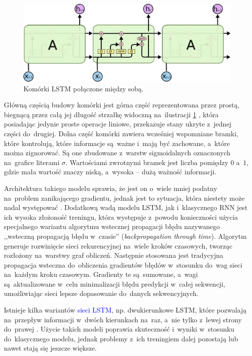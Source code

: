 \documentclass[data-science]{agh-wi} %
\begin{document}
\begin{figure}[ht!]
    \begin{center}
        \includegraphics[width=0.6\linewidth]{./img/LSTM3-chain.png}
    \end{center}
    \caption{Komórki LSTM połączone między sobą.}\label{fig:lstm_chain}
\end{figure}

Główną częścią budowy komórki jest górna część reprezentowana przez prostą, biegnącą przez całą jej długość strzałkę widoczną na~ilustracji \ref*{fig:lstm_chain} \cite{Understanding_lstm}, która posiadając jedynie proste operacje liniowe, przekazuje stany ukryte z~jednej części do~drugiej. Dolna część komórki zawiera wcześniej wspomniane bramki, które kontrolują, które informacje są~ważne i~mają być zachowane, a~które można zignorować. Są one zbudowane z~warstw sigmoidalnych oznaczonych na~grafice literami $\sigma$. Wartościami zwrotnymi bramek jest liczba pomiędzy $0$ a~$1$, gdzie mała wartość znaczy niską, a~wysoka -- dużą ważność informacji.

Architektura takiego modelu sprawia, że jest on o~wiele mniej podatny na~problem zanikającego gradientu, jednak jest to sytuacja, która niestety może nadal występować \cite{vanishing_gradient}. Dodatkową wadą modelu LSTM, jak i~klasycznego RNN jest ich wysoka złożoność treningu, która występuje z~powodu konieczności użycia specjalnego wariantu algorytmu wstecznej propagacji błędu nazywanego ,,wsteczną propagacją błędu w~czasie'' (\textit{backpropagation through time}). Algorytm generuje rozwinięcie sieci rekurencyjnej na~wiele kroków czasowych, tworząc rozłożony na~warstwy graf obliczeń. Następnie stosowana jest tradycyjna propagacja wsteczna do~obliczenia gradientów błędów w~stosunku do~wag sieci na~każdym kroku czasowym. Gradienty te są~sumowane, a~wagi są~aktualizowane w~celu minimalizacji błędu predykcji w~całej sekwencji, umożliwiając sieci lepsze dopasowanie do~danych sekwencyjnych.

Istnieje kilka wariantów \textcolor{blue}{sieci LSTM}, np. dwukierunkowe LSTM, które pozwalają na~przepływ informacji w~dwóch kierunkach na~raz, a~nie tylko z~lewej strony do~prawej \cite{bi_lstm}. Użycie takich modeli poprawia skuteczność i~wyniki w~stosunku do~klasycznego modelu, jednak problemy z~ich treningiem dalej pozostają lub nawet stają się jeszcze większe.
\end{document}

